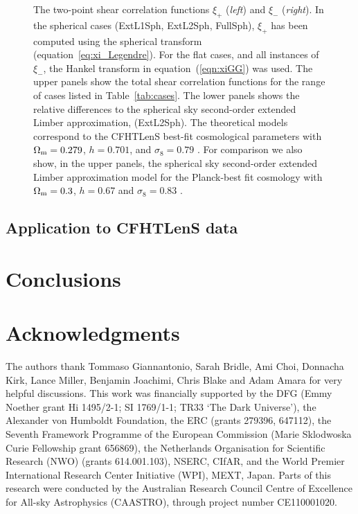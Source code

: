 \documentclass[fleqn,usenatbib]{mnras} %
\begin{document}
\begin{figure}
  \caption{The two-point shear correlation functions $\xi_+$ (\emph{left}) and $\xi_-$ (\emph{right}).
  In the spherical cases (ExtL1Sph, ExtL2Sph, FullSph), $\xi_+$ has been computed using the spherical
  transform (equation~\ref{eq:xi_Legendre}). For the flat cases, and all instances of $\xi_-$, the Hankel transform
  in equation~(\ref{eqn:xiGG}) was used.
  The upper panels
  show the total shear correlation functions for the range of cases listed in Table~\ref{tab:cases}.
    The lower panels shows the relative differences to the spherical sky second-order extended Limber approximation, (ExtL2Sph).
     The theoretical models correspond to the CFHTLenS best-fit cosmological parameters with
    $\Omega_{\rm m} = 0.279$, $h=0.701$, and $\sigma_8 = 0.79$ \citep{CFHTLenS-2pt-notomo}.  For comparison we
    	also show, in the upper panels, the spherical sky second-order extended Limber approximation model for the Planck-best fit
    cosmology with $\Omega_{\rm m} = 0.3$, $h=0.67$ and $\sigma_8 = 0.83$ \citep{2015arXiv150201589P}.
  }

  \label{fig:xi_pm}

\end{figure}



\subsection{Application to CFHTLenS data}
\label{sec:cfhtlens}






\section{Conclusions}


\section*{Acknowledgments}

The authors thank Tommaso Giannantonio, Sarah Bridle, Ami Choi, Donnacha Kirk,
Lance Miller, Benjamin Joachimi, Chris Blake and Adam Amara for very helpful
discussions. This work was financially supported by the DFG (Emmy Noether grant
Hi 1495/2-1; SI 1769/1-1; TR33 `The Dark Universe'), the Alexander von Humboldt
Foundation, the ERC (grants 279396, 647112), the Seventh Framework Programme of
the European Commission (Marie Sklodwoska Curie Fellowship grant 656869), the
Netherlands Organisation for Scientific Research (NWO) (grants 614.001.103),
NSERC, CIfAR, and the World Premier International Research Center Initiative
(WPI), MEXT, Japan. Parts of this research were conducted by the Australian
Research Council Centre of Excellence for All-sky Astrophysics (CAASTRO),
through project number CE110001020. 
\end{document}
